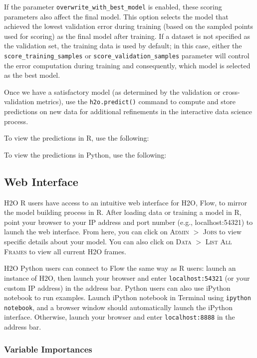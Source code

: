 {{If the parameter \texttt{overwrite\_with\_best\_model} is enabled, these scoring parameters also affect the final model. This option selects the model that achieved the lowest validation error during training (based on the sampled points used for scoring) as the final model after training. If a dataset is not specified as the validation set, the training data is used by default; in this case, either the \texttt{score\_training\_samples} or \texttt{score\_validation\_samples} parameter will control the error computation during training and consequently, which model is selected as the best model.

Once we have a satisfactory model (as determined by the validation or cross-validation metrics), use the \texttt{h2o.predict()} command to compute and store predictions on new data for additional refinements in the interactive data science process.

\waterExampleInR
To view the predictions in R, use the following: 


\waterExampleInPython
To view the predictions in Python, use the following: 


\subsection{Web Interface} 

H2O R users have access to an intuitive web interface for H2O, Flow, to mirror the model building process in R. After loading data or training a model in R, point your browser to your IP address and port number (e.g., localhost:54321) to launch the web interface. From here, you can click on \textsc{Admin} $>$ \textsc{Jobs} to view specific details about your model. You can also click on \textsc{Data} $>$ \textsc{List All Frames} to view all current H2O frames. 

H2O Python users can connect to Flow the same way as R users: launch an instance of H2O, then launch your browser and enter \texttt{localhost:54321} (or your custom IP address) in the address bar. Python users can also use iPython notebook to run examples. Launch iPython notebook in Terminal using \texttt{ipython notebook}, and a browser window should automatically launch the iPython interface. Otherwise, launch your browser and enter \texttt{localhost:8888} in the address bar. 
\newpage
\subsubsection{Variable Importances} 

}}
